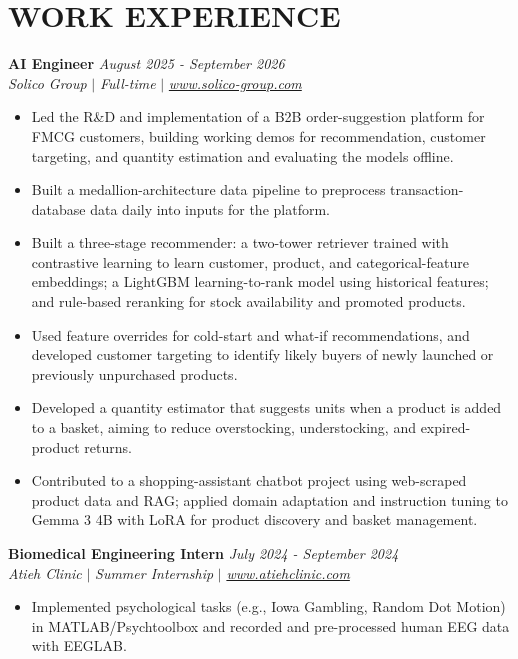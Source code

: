 \documentclass[11pt,a4paper,roman]{moderncv}        %
\begin{document}
    \section{WORK EXPERIENCE}
 \textbf{AI Engineer} \hfill{\emph{August 2025 - September 2026}}\\ \emph{Solico Group} $|$ \emph{Full-time} $|$ \href{https://www.solico-group.com}{\textcolor{blue link}{\emph{www.solico-group.com}}}
 \begin{itemize}
 \vspace{2mm}
     \item Led the R\&D and implementation of a B2B order-suggestion platform for FMCG customers, building working demos for recommendation, customer targeting, and quantity estimation and evaluating the models offline.
     \vspace{1mm}
     \item Built a medallion-architecture data pipeline to preprocess transaction-database data daily into inputs for the platform.
     \vspace{1mm}
     \item Built a three-stage recommender: a two-tower retriever trained with contrastive learning to learn customer, product, and categorical-feature embeddings; a LightGBM learning-to-rank model using historical features; and rule-based reranking for stock availability and promoted products.
     \vspace{1mm}
     \item Used feature overrides for cold-start and what-if recommendations, and developed customer targeting to identify likely buyers of newly launched or previously unpurchased products.
     \vspace{1mm}
     \item Developed a quantity estimator that suggests units when a product is added to a basket, aiming to reduce overstocking, understocking, and expired-product returns.
     \vspace{1mm}
     \item Contributed to a shopping-assistant chatbot project using web-scraped product data and RAG; applied domain adaptation and instruction tuning to Gemma 3 4B with LoRA for product discovery and basket management.
     \end{itemize}
\vspace{2mm}
     \textbf{Biomedical Engineering Intern} \hfill{\emph{July 2024 - September 2024}}\\ \emph{Atieh Clinic} $|$ \emph{Summer Internship} $|$ \href{https://atiehclinic.com}{\textcolor{blue link}{\emph{www.atiehclinic.com}}}
 	\begin{itemize}
 		\item Implemented psychological tasks (e.g., Iowa Gambling, Random Dot Motion) in MATLAB/Psychtoolbox and recorded and pre-processed human EEG data with EEGLAB.
    \end{itemize}
 
\end{document}
